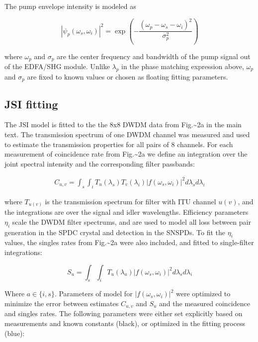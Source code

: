 \documentclass[11pt]{caltech_thesis} %
\begin{document}
The pump envelope intensity is modeled as

$$|\psi_p\left(\omega_s, \omega_i\right)|^2=\exp \left(-\frac{\left(\omega_p-\omega_s-\omega_i\right)^2}{\sigma_p^2}\right)$$

where $\omega_p$ and $\sigma_p$ are the center frequency and bandwidth of the pump signal out of the EDFA/SHG module. Unlike $\lambda_p$ in the phase matching expression above, $\omega_p$ and $\sigma_p$ are fixed to known values or chosen as floating fitting parameters.

\hypertarget{jsi-fitting}{%
\subsection{JSI fitting}\label{jsi-fitting}}

The JSI model is fitted to the the 8x8 DWDM data from Fig.\textasciitilde2a in the main text. The transmission spectrum of one DWDM channel was measured and used to estimate the transmission properties for all pairs of 8 channels. For each measurement of coincidence rate from Fig.\textasciitilde2a we define an integration over the joint spectral intensity and the corresponding filter passbands:

\hypertarget{eq:c_uv}{}{
\begin{align}
    C_{u,v} = \int_{s}\int_{i}T_u(\lambda_s)T_v(\lambda_i)|f(\omega_s, \omega_i)|^2 d\lambda_s d\lambda_i \label{eq:c_uv}
\end{align}
}

where $T_{u(v)}$ is the transmission spectrum for filter with ITU channel $u (v)$, and the integrations are over the signal and idler wavelengths. Efficiency parameters $\eta_i$ scale the DWDM filter spectrums, and are used to model all loss between pair generation in the SPDC crystal and detection in the SNSPDs. To fit the $\eta_i$ values, the singles rates from Fig.\textasciitilde2a were also included, and fitted to single-filter integrations:

$$S_{u} = \int_{s}\int_{i}T_{u}(\lambda_a)|f(\omega_s, \omega_i)|^2 d\lambda_s d\lambda_i$$

Where $a \in \{i, s\}$. Parameters of model for $|f(\omega_s, \omega_i)|^2$ were optimized to minimize the error between estimates $C_{u,v}$ and $S_u$ and the measured coincidence and singles rates. The following parameters were either set explicitly based on measurements and known constants (black), or optimized in the fitting process (blue):
\end{document}

